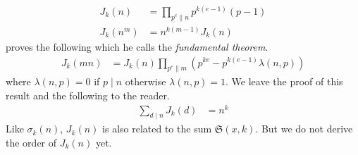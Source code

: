 \documentclass[elemannt.tex]{subfile}
\begin{document}
		\begin{align*}
			J_{k}(n)
				& = \prod_{p^{e}\|n}p^{k(e-1)}(p-1)\\
			J_{k}(n^{m})
				& = n^{k(m-1)}J_{k}(n)
		\end{align*}
	\textcite[Theorem VI]{lehmer_1900} proves the following which he calls the \textit{fundamental theorem}.
		\begin{align}
			J_{k}(mn)
				& = J_{k}(n)\prod_{p^{e}\parallel m}\left(p^{ke}-p^{k(e-1)}\lambda(n,p)\right)\label{thm:lehfund}
		\end{align}
	where $\lambda(n,p)=0$ if $p\mid n$ otherwise $\lambda(n,p)=1$. We leave the proof of this result and the following to the reader.
		\begin{align*}
			\sum_{d\mid n}J_{k}(d)
				& = n^{k}
		\end{align*}
	 Like $\sigma_{k}(n)$, $J_{k}(n)$ is also  related to the sum $\mathfrak{S}(x, k)$. But we do not derive the order of $J_{k}(n)$ yet.
\end{document}
